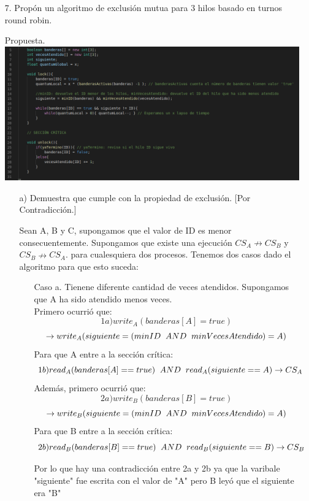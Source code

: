 \documentclass[12pt, letterpaper]{article}
\begin{document}
\begin{itemize}
\item[7. ] Propón un algoritmo de exclusión mutua para 3 hilos basado en turnos round robin.

Propuesta.\\
\includegraphics[width=\textwidth]{EM}\\
\begin{itemize}
\item[a) ] Demuestra que cumple con la propiedad de exclusión.
[Por Contradicción.]

Sean A, B y C, supongamos que el valor de ID es menor consecuentemente.
Supongamos que existe una ejecución $CS_A \nrightarrow CS_B$ y $CS_B \nrightarrow CS_A$.
para cualesquiera dos procesos. Tenemos dos casos dado el algoritmo para que esto suceda:
\begin{itemize}
\item[Caso a. ] Tienene diferente cantidad de veces atendidos. Supongamos que A ha sido atendido menos veces.\\
Primero ocurrió que:
\[1a)write_A(banderas[A] = true)\] \[ \rightarrow write_A(siguiente = (minID\hspace{0.2cm}AND \hspace{0.2cm}minVecesAtendido) = A)\]
Para que A entre a la sección crítica:
\[1b) read_A(banderas[A] == true)\hspace{0.2cm}AND\hspace{0.2cm}read_A(siguiente == A) \rightarrow CS_A\]
Además, primero ocurrió que:
\[2a)write_B(banderas[B] = true)\] \[ \rightarrow write_B(siguiente = (minID\hspace{0.2cm}AND \hspace{0.2cm}minVecesAtendido) = A)\]
Para que B entre a la sección crítica:
\[2b) read_B(banderas[B] == true)\hspace{0.2cm}AND\hspace{0.2cm}read_B(siguiente == B) \rightarrow CS_B\]

Por lo que hay una contradicción entre 2a y 2b ya que la varibale "siguiente" fue escrita con el valor de "A" pero B leyó que el siguiente era "B"


\end{itemize}
\end{itemize}
\end{itemize}
\end{document}

